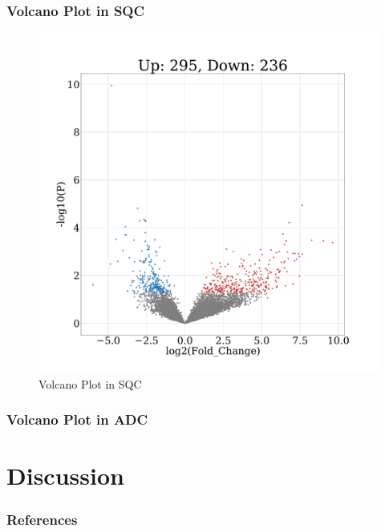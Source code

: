 \documentclass{beamer}
\begin{document}
    \begin{frame}
        \frametitle{Volcano Plot in SQC}

        \begin{figure}
            \includegraphics[width=0.5 \linewidth]{figures/DEG/SQC.volcano.pdf}
            \caption{Volcano Plot in SQC}
        \end{figure}
    \end{frame}

    \begin{frame}
        \frametitle{Volcano Plot in ADC}
    \end{frame}

    \section{Discussion}

    \begin{frame}[allowframebreaks]
        \frametitle{References}
        
        
    \end{frame}
\end{document}
